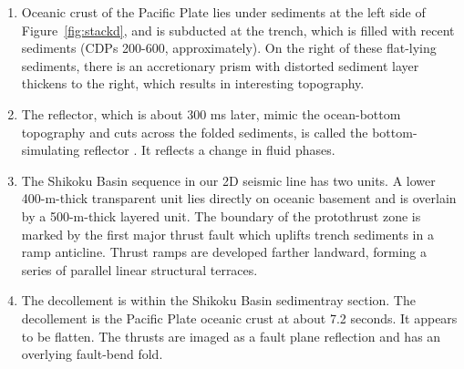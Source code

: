 \begin{enumerate}

\item Oceanic crust of the Pacific Plate lies under sediments at the left side of Figure~\ref{fig:stackd}, and is subducted at the trench, which is filled with recent sediments (CDPs 200-600, approximately). On the right of these flat-lying sediments, there is an accretionary prism with distorted sediment layer thickens to the right, which results in interesting topography. 

\item The reflector, which is about 300 ms later, mimic the ocean-bottom topography and cuts across the folded sediments, is called the bottom-simulating reflector \cite[]{SU}. It reflects a change in fluid phases.  

\item The Shikoku Basin sequence in our 2D seismic line has two units. A lower 400-m-thick transparent unit lies directly on oceanic basement and is overlain by a 500-m-thick layered unit. The boundary of the protothrust zone is marked by the first major thrust fault which uplifts trench sediments in a ramp anticline. Thrust ramps are developed farther landward, forming a series of parallel linear structural terraces.

\item The decollement is within the Shikoku Basin sedimentray section. The decollement is the Pacific Plate oceanic crust at about 7.2 seconds. It appears to be flatten. The thrusts are imaged as a fault plane reflection and has an overlying fault-bend fold.   

\end{enumerate}
\lstset{language=python,numbers=left,numberstyle=\tiny,showstringspaces=false}






